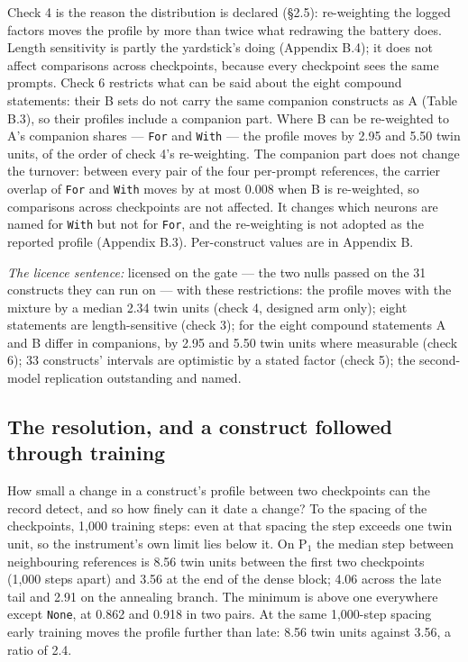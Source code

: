\documentclass{article}
\begin{document}
Check 4 is the reason the distribution is declared (\S2.5): re-weighting the logged factors moves the profile by more than twice what redrawing the battery does. Length sensitivity is partly the yardstick's doing (Appendix B.4); it does not affect comparisons across checkpoints, because every checkpoint sees the same prompts. Check 6 restricts what can be said about the eight compound statements: their B sets do not carry the same companion constructs as A (Table B.3), so their profiles include a companion part. Where B can be re-weighted to A's companion shares --- \texttt{For} and \texttt{With} --- the profile moves by 2.95 and 5.50 twin units, of the order of check 4's re-weighting. The companion part does not change the turnover: between every pair of the four per-prompt references, the carrier overlap of \texttt{For} and \texttt{With} moves by at most 0.008 when B is re-weighted, so comparisons across checkpoints are not affected. It changes which neurons are named for \texttt{With} but not for \texttt{For}, and the re-weighting is not adopted as the reported profile (Appendix B.3). Per-construct values are in Appendix B.

\emph{The licence sentence:} licensed on the gate --- the two nulls passed on the 31 constructs they can run on --- with these restrictions: the profile moves with the mixture by a median 2.34 twin units (check 4, designed arm only); eight statements are length-sensitive (check 3); for the eight compound statements A and B differ in companions, by 2.95 and 5.50 twin units where measurable (check 6); 33 constructs' intervals are optimistic by a stated factor (check 5); the second-model replication outstanding and named.


\subsection{The resolution, and a construct followed through training}

How small a change in a construct's profile between two checkpoints can the record detect, and so how finely can it date a change? To the spacing of the checkpoints, 1,000 training steps: even at that spacing the step exceeds one twin unit, so the instrument's own limit lies below it. On P$_1$ the median step between neighbouring references is 8.56 twin units between the first two checkpoints (1,000 steps apart) and 3.56 at the end of the dense block; 4.06 across the late tail and 2.91 on the annealing branch. The minimum is above one everywhere except \texttt{None}, at 0.862 and 0.918 in two pairs. At the same 1,000-step spacing early training moves the profile further than late: 8.56 twin units against 3.56, a ratio of 2.4.
\end{document}
